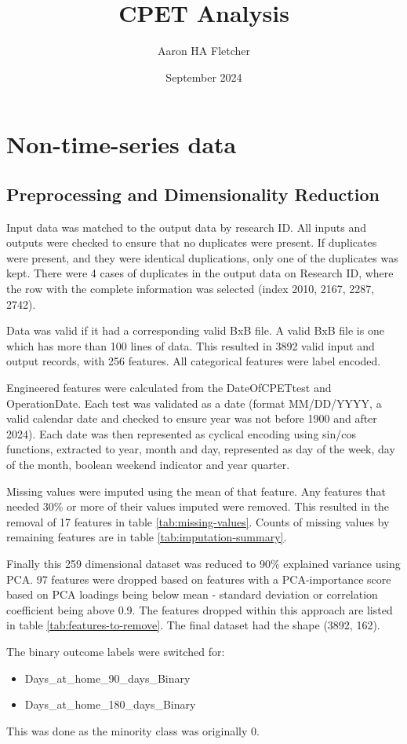 \documentclass{article}
\title{CPET Analysis}
\author{Aaron HA Fletcher}
\date{September 2024}
\begin{document}
\maketitle

\section{Non-time-series data}
\subsection{Preprocessing and Dimensionality Reduction}
Input data was matched to the output data by research ID. All inputs and outputs were checked to ensure that no duplicates were present. If duplicates were present, and they were identical duplications, only one of the duplicates was kept. There were 4 cases of duplicates in the output data on Research ID, where the row with the complete information was selected (index 2010, 2167, 2287, 2742).  

Data was valid if it had a corresponding valid BxB file. A valid BxB file is one which has more than 100 lines of data.
This resulted in 3892 valid input and output records, with 256 features. All categorical features were label encoded.

Engineered features were calculated from the DateOfCPETtest and OperationDate. Each test was validated as a date (format MM/DD/YYYY, a valid calendar date and checked to ensure year was not before 1900 and after 2024). Each date was then represented as cyclical encoding using sin/cos functions, extracted to year, month and day, represented as day of the week, day of the month, boolean weekend indicator and year quarter. 

Missing values were imputed using the mean of that feature. Any features that needed 30\% or more of their values imputed were removed. This resulted in the removal of 17 features in table \ref{tab:missing-values}. Counts of missing values by remaining features are in table \ref{tab:imputation-summary}.

Finally this 259 dimensional dataset was reduced to 90\% explained variance using PCA. 97 features were dropped based on features with a PCA-importance score based on PCA loadings being below mean - standard deviation or correlation coefficient being above 0.9. The features dropped within this approach are listed in table \ref{tab:features-to-remove}. The final dataset had the shape (3892, 162). 

The binary outcome labels were switched for:
\begin{itemize}
    \item Days\_at\_home\_90\_days\_Binary
    \item Days\_at\_home\_180\_days\_Binary
\end{itemize}
This was done as the minority class was originally 0.
\end{document}
